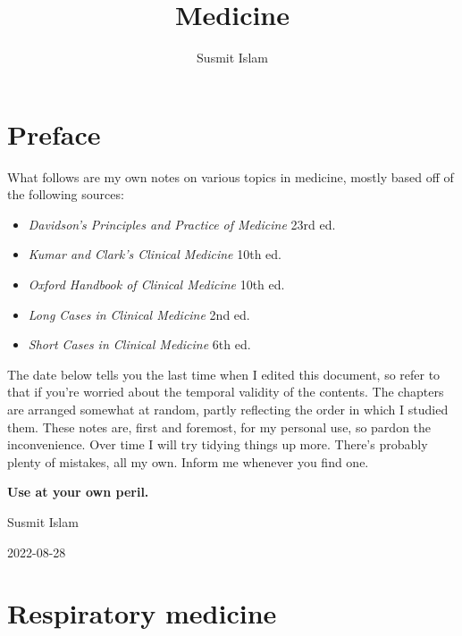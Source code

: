\documentclass[
  12pt,
]{memoir}
\title{Medicine}
\author{Susmit Islam}
\date{}
\providecommand{\tightlist}{%
  \setlength{\itemsep}{0pt}\setlength{\parskip}{0pt}}
\begin{document}
\frontmatter

\maketitle

\mainmatter
\renewcommand{\labelitemi}{$\blacktriangleright$}
\renewcommand{\labelitemii}{$\boldsymbol\circ$}
\renewcommand{\labelitemiii}{$\bullet$}
\renewcommand{\labelitemiv}{\tiny$\blacksquare$}

\openany
\raggedbottom
\twocoltocetc
\tableofcontents

\pagebreak

\hypertarget{preface}{%
\chapter*{Preface}\label{preface}}

What follows are my own notes on various topics in medicine, mostly
based off of the following sources:

\begin{itemize}
\tightlist
\item
  \emph{Davidson's Principles and Practice of Medicine} 23rd ed.
\item
  \emph{Kumar and Clark's Clinical Medicine} 10th ed.
\item
  \emph{Oxford Handbook of Clinical Medicine} 10th ed.
\item
  \emph{Long Cases in Clinical Medicine} 2nd ed.
\item
  \emph{Short Cases in Clinical Medicine} 6th ed.
\end{itemize}

The date below tells you the last time when I edited this document, so
refer to that if you're worried about the temporal validity of the
contents. The chapters are arranged somewhat at random, partly
reflecting the order in which I studied them. These notes are, first and
foremost, for my personal use, so pardon the inconvenience. Over time I
will try tidying things up more. There's probably plenty of mistakes,
all my own. Inform me whenever you find one.\newline

\textbf{Use at your own peril.}

\hfill Susmit Islam

\hfill 2022-08-28

\hypertarget{respiratory-medicine}{%
\chapter{Respiratory medicine}\label{respiratory-medicine}}
\end{document}
